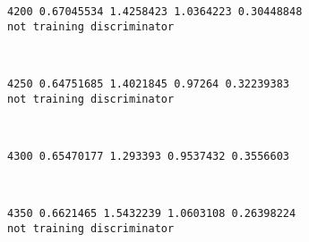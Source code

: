 \documentclass[11pt]{article}
\begin{document}
    \begin{Verbatim}[commandchars=\\\{\}]
4200 0.67045534 1.4258423 1.0364223 0.30448848
not training discriminator

    \end{Verbatim}

    \begin{center}
    \end{center}
    { \hspace*{\fill} \\}
    
    \begin{Verbatim}[commandchars=\\\{\}]
4250 0.64751685 1.4021845 0.97264 0.32239383
not training discriminator

    \end{Verbatim}

    \begin{center}
    \end{center}
    { \hspace*{\fill} \\}
    
    \begin{Verbatim}[commandchars=\\\{\}]
4300 0.65470177 1.293393 0.9537432 0.3556603

    \end{Verbatim}

    \begin{center}
    \end{center}
    { \hspace*{\fill} \\}
    
    \begin{Verbatim}[commandchars=\\\{\}]
4350 0.6621465 1.5432239 1.0603108 0.26398224
not training discriminator

    \end{Verbatim}

    \begin{center}
    \end{center}
    { \hspace*{\fill} \\}
    
\end{document}
